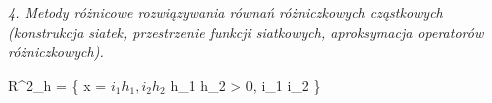 \textit{4. Metody różnicowe rozwiązywania równań różniczkowych cząstkowych (konstrukcja siatek, przestrzenie funkcji siatkowych, aproksymacja operatorów różniczkowych).}


R^{2}_{h} = \{ x = \(i_{1}h_{1}, i_{2}h_{2}\) h_{1} h_{2} > 0, i_{1} i_{2} \in {}\}